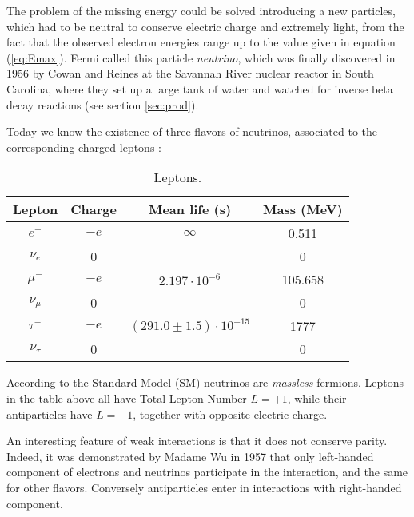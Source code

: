 \documentclass{subnucbo}
\begin{document}
The problem of the missing energy could be solved introducing a new particles, which had to be neutral to conserve electric charge and extremely light, from the fact that the observed electron energies range up to the value given in equation (\ref{eq:Emax}).
Fermi called this particle \emph{neutrino}, which was finally discovered in 1956 by Cowan and Reines at the Savannah River nuclear reactor in South Carolina, where they set up a large tank of water and watched for inverse beta decay reactions (see section \ref{sec:prod}).

Today we know the existence of three flavors of neutrinos, associated to the corresponding charged leptons %
:
\begin{table}[H]
\begin{tabular}{cccc}
\toprule
Lepton & Charge & Mean life (s) & Mass (MeV)\\
\midrule
$e^-$ & $-e$ & $\infty$ & 0.511\\
$\nu_e$ & 0 &  & 0\\
$\mu^-$ & $-e$ & $2.197\cdot10^{-6}$ & 105.658\\
$\nu_\mu$ & 0 & & 0\\
$\tau^-$ & $-e$ & $(291.0\pm1.5)\cdot10^{-15}$ & 1777\\
$\nu_\tau$ & 0 &  & 0\\
\bottomrule
\end{tabular}
\caption{Leptons.}
\label{tab:classification}
\end{table}
 
According to the Standard Model (SM) neutrinos are \emph{massless} fermions. Leptons in the table above all have Total Lepton Number $L=+1$, while their antiparticles have $L=-1$, together with opposite electric charge.

An interesting feature of weak interactions is that it does not conserve parity. Indeed, it was demonstrated by Madame Wu in 1957 that only left-handed component of electrons and neutrinos participate in the interaction, and the same for other flavors. Conversely antiparticles enter in interactions with right-handed component.
\end{document}
